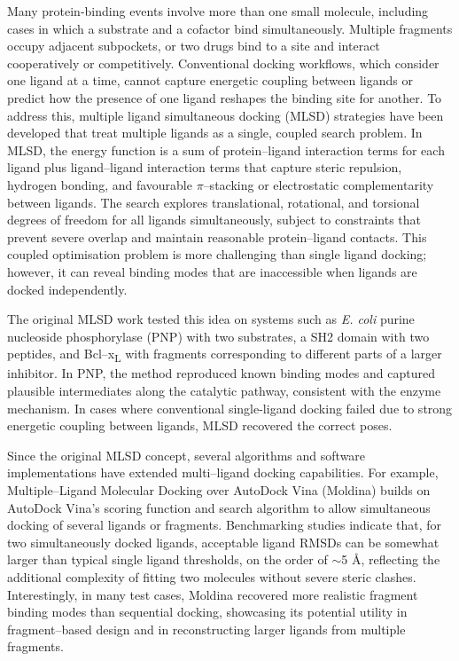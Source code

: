 \documentclass[12pt]{article}
\begin{document}
Many protein-binding events involve more than one small molecule, including cases in which a substrate and a cofactor bind simultaneously. Multiple fragments occupy adjacent subpockets, or two drugs bind to a site and interact cooperatively or competitively.  Conventional docking workflows, which consider one ligand at a time, cannot capture energetic coupling between ligands or predict how the presence of one ligand reshapes the binding site for another.  To address this, multiple ligand simultaneous docking (MLSD) strategies have been developed that treat multiple ligands as a single, coupled search problem\cite{CH14_MLSD2010}. In MLSD, the energy function is a sum of protein–ligand interaction terms for each ligand plus ligand–ligand interaction terms that capture steric repulsion, hydrogen bonding, and favourable $\pi$–stacking or electrostatic complementarity between ligands.  The search explores translational, rotational, and torsional degrees of freedom for all ligands simultaneously, subject to constraints that prevent severe overlap and maintain reasonable protein–ligand contacts\cite{CH14_MLSD2010}. This coupled optimisation problem is more challenging than single ligand docking; however, it can reveal binding modes that are inaccessible when ligands are docked independently.

The original MLSD work tested this idea on systems such as \emph{E. coli} purine nucleoside phosphorylase (PNP) with two substrates, a SH2 domain with two peptides, and Bcl–x\textsubscript{L} with fragments corresponding to different parts of a larger inhibitor. In PNP, the method reproduced known binding modes and captured plausible intermediates along the catalytic pathway, consistent with the enzyme mechanism. In cases where conventional single-ligand docking failed due to strong energetic coupling between ligands, MLSD recovered the correct poses\cite{CH14_MLSD2010}.

Since the original MLSD concept, several algorithms and software implementations have extended multi–ligand docking capabilities.  For example, Multiple–Ligand Molecular Docking over AutoDock Vina (Moldina)\cite{CH14_Moldina2025} builds on AutoDock Vina’s scoring function and search algorithm to allow simultaneous docking of several ligands or fragments. Benchmarking studies\cite{CH14_Moldina2025}  indicate that, for two simultaneously docked ligands, acceptable ligand RMSDs can be somewhat larger than typical single ligand thresholds, on the order of $\sim$5 \r{A}, reflecting the additional complexity of fitting two molecules without severe steric clashes. Interestingly, in many test cases, Moldina\cite{CH14_Moldina2025} recovered more realistic fragment binding modes than sequential docking, showcasing its potential utility in fragment–based design and in reconstructing larger ligands from multiple fragments. 
\end{document}
